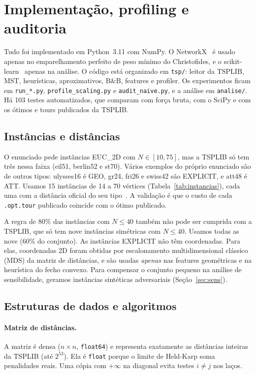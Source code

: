 \section{Implementação, profiling e auditoria}\label{sec:impl}

Tudo foi implementado em Python~3.11 com NumPy. O NetworkX~\cite{hagberg2008}
é usado apenas no emparelhamento perfeito de peso mínimo do Christofides, e o
scikit-learn~\cite{pedregosa2011} apenas na análise. O código está organizado
em \texttt{tsp/}: leitor da TSPLIB, MST, heurísticas, aproximativos, B\&B,
features e profiler. Os experimentos ficam em \texttt{run\_*.py},
\texttt{profile\_scaling.py} e \texttt{audit\_naive.py}, e a análise em
\texttt{analise/}. Há 103 testes automatizados, que comparam com força
bruta, com o SciPy e com os ótimos e tours publicados da TSPLIB.

\subsection{Instâncias e distâncias}
O enunciado pede instâncias EUC\_2D com $N\in[10,75]$, mas a TSPLIB só tem
três nessa faixa (eil51, berlin52 e st70). Vários exemplos do próprio
enunciado são de outros tipos: ulysses16 é GEO, gr24, fri26 e swiss42 são
EXPLICIT, e att48 é ATT. Usamos 15 instâncias de 14 a 70 vértices
(Tabela~\ref{tab:instancias}), cada uma com a distância oficial do seu
tipo~\cite{reinelt1991}. A validação é que o custo de cada \texttt{.opt.tour}
publicado coincide com o ótimo publicado.

A regra de 80\% das instâncias com $N\le 40$ também não pode ser cumprida
com a TSPLIB, que só tem nove instâncias simétricas com $N\le40$. Usamos
todas as nove (60\% do conjunto). As instâncias EXPLICIT não têm
coordenadas. Para elas, coordenadas 2D foram obtidas por escalonamento
multidimensional clássico (MDS) da matriz de distâncias, e são usadas
\emph{apenas} nas features geométricas e na heurística do fecho convexo.
Para compensar o conjunto pequeno na análise de sensibilidade, geramos
instâncias sintéticas adversariais (Seção~\ref{sec:sens}).



\subsection{Estruturas de dados e algoritmos}

\paragraph{Matriz de distâncias.} A matriz é densa ($n\times n$,
\texttt{float64}) e representa exatamente as distâncias inteiras da TSPLIB
(até $2^{53}$). Ela é \texttt{float} porque o limite de Held-Karp soma
penalidades reais. Uma cópia com $+\infty$ na diagonal evita testes
$i\neq j$ nos laços.

